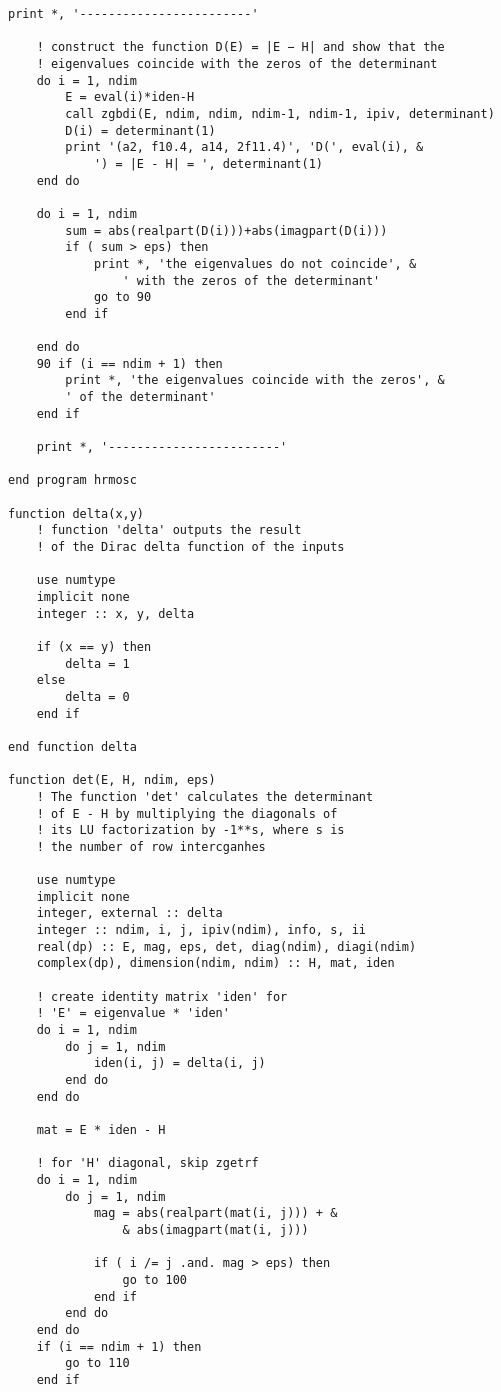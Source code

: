 \documentclass[12pt]{article}
\begin{document}
\begin{lstlisting}[frame=single,caption={{\tt Fortran 90} Code {\tt hrmosc.f90}},label=hrmosc]
    print *, '------------------------'

    ! construct the function D(E) = |E − H| and show that the 
    ! eigenvalues coincide with the zeros of the determinant
    do i = 1, ndim
        E = eval(i)*iden-H 
        call zgbdi(E, ndim, ndim, ndim-1, ndim-1, ipiv, determinant)
        D(i) = determinant(1)
        print '(a2, f10.4, a14, 2f11.4)', 'D(', eval(i), &
            ') = |E - H| = ', determinant(1)
    end do

    do i = 1, ndim
        sum = abs(realpart(D(i)))+abs(imagpart(D(i)))
        if ( sum > eps) then
            print *, 'the eigenvalues do not coincide', &
                ' with the zeros of the determinant'
            go to 90
        end if
    
    end do
    90 if (i == ndim + 1) then
        print *, 'the eigenvalues coincide with the zeros', &
        ' of the determinant'
    end if

    print *, '------------------------'

end program hrmosc

function delta(x,y)
    ! function 'delta' outputs the result 
    ! of the Dirac delta function of the inputs

    use numtype
    implicit none
    integer :: x, y, delta

    if (x == y) then
        delta = 1
    else
        delta = 0
    end if

end function delta 

function det(E, H, ndim, eps)
    ! The function 'det' calculates the determinant
    ! of E - H by multiplying the diagonals of 
    ! its LU factorization by -1**s, where s is
    ! the number of row intercganhes

    use numtype
    implicit none
    integer, external :: delta
    integer :: ndim, i, j, ipiv(ndim), info, s, ii
    real(dp) :: E, mag, eps, det, diag(ndim), diagi(ndim)
    complex(dp), dimension(ndim, ndim) :: H, mat, iden

    ! create identity matrix 'iden' for 
    ! 'E' = eigenvalue * 'iden'
    do i = 1, ndim 
        do j = 1, ndim
            iden(i, j) = delta(i, j)
        end do
    end do

    mat = E * iden - H 

    ! for 'H' diagonal, skip zgetrf
    do i = 1, ndim
        do j = 1, ndim
            mag = abs(realpart(mat(i, j))) + & 
                & abs(imagpart(mat(i, j)))

            if ( i /= j .and. mag > eps) then
                go to 100
            end if
        end do
    end do
    if (i == ndim + 1) then
        go to 110
    end if


\end{lstlisting}
\end{document}
